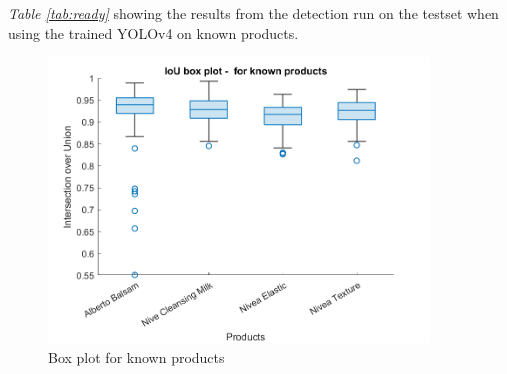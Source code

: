 \begin{table}[h]
\caption{Detection results when tested on trained data}
\label{tab:ready}
\end{table}
\textit{Table \ref{tab:ready}} showing the results from the detection run on the testset when using the trained YOLOv4 on known products.

\begin{figure}[h]
    \centering
    \includegraphics[width=0.9\textwidth]{graphics/results/boxplotForKnownProducts.png}
    \caption{Box plot for known products}
    \label{fig:boxknownproducts}
\end{figure}

\clearpage
